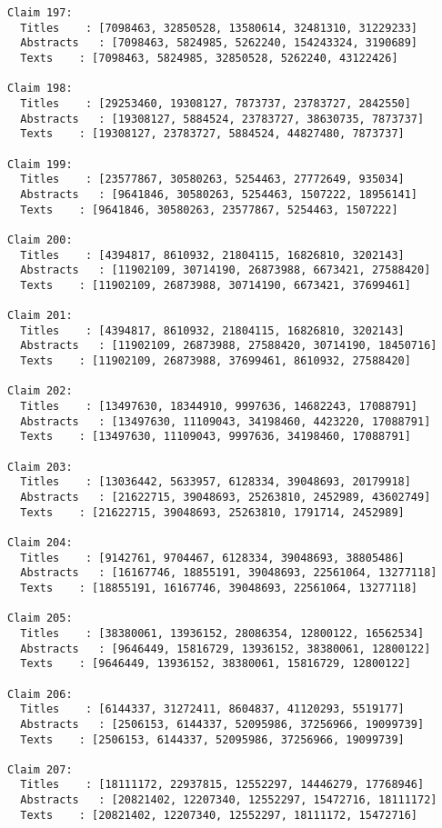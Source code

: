 \documentclass[11pt]{article}
\begin{document}
\begin{Verbatim}[commandchars=\\\{\}]
Claim 197:
  Titles    : [7098463, 32850528, 13580614, 32481310, 31229233]
  Abstracts   : [7098463, 5824985, 5262240, 154243324, 3190689]
  Texts    : [7098463, 5824985, 32850528, 5262240, 43122426]

Claim 198:
  Titles    : [29253460, 19308127, 7873737, 23783727, 2842550]
  Abstracts   : [19308127, 5884524, 23783727, 38630735, 7873737]
  Texts    : [19308127, 23783727, 5884524, 44827480, 7873737]

Claim 199:
  Titles    : [23577867, 30580263, 5254463, 27772649, 935034]
  Abstracts   : [9641846, 30580263, 5254463, 1507222, 18956141]
  Texts    : [9641846, 30580263, 23577867, 5254463, 1507222]

Claim 200:
  Titles    : [4394817, 8610932, 21804115, 16826810, 3202143]
  Abstracts   : [11902109, 30714190, 26873988, 6673421, 27588420]
  Texts    : [11902109, 26873988, 30714190, 6673421, 37699461]

Claim 201:
  Titles    : [4394817, 8610932, 21804115, 16826810, 3202143]
  Abstracts   : [11902109, 26873988, 27588420, 30714190, 18450716]
  Texts    : [11902109, 26873988, 37699461, 8610932, 27588420]

Claim 202:
  Titles    : [13497630, 18344910, 9997636, 14682243, 17088791]
  Abstracts   : [13497630, 11109043, 34198460, 4423220, 17088791]
  Texts    : [13497630, 11109043, 9997636, 34198460, 17088791]

Claim 203:
  Titles    : [13036442, 5633957, 6128334, 39048693, 20179918]
  Abstracts   : [21622715, 39048693, 25263810, 2452989, 43602749]
  Texts    : [21622715, 39048693, 25263810, 1791714, 2452989]

Claim 204:
  Titles    : [9142761, 9704467, 6128334, 39048693, 38805486]
  Abstracts   : [16167746, 18855191, 39048693, 22561064, 13277118]
  Texts    : [18855191, 16167746, 39048693, 22561064, 13277118]

Claim 205:
  Titles    : [38380061, 13936152, 28086354, 12800122, 16562534]
  Abstracts   : [9646449, 15816729, 13936152, 38380061, 12800122]
  Texts    : [9646449, 13936152, 38380061, 15816729, 12800122]

Claim 206:
  Titles    : [6144337, 31272411, 8604837, 41120293, 5519177]
  Abstracts   : [2506153, 6144337, 52095986, 37256966, 19099739]
  Texts    : [2506153, 6144337, 52095986, 37256966, 19099739]

Claim 207:
  Titles    : [18111172, 22937815, 12552297, 14446279, 17768946]
  Abstracts   : [20821402, 12207340, 12552297, 15472716, 18111172]
  Texts    : [20821402, 12207340, 12552297, 18111172, 15472716]


\end{Verbatim}
\end{document}
